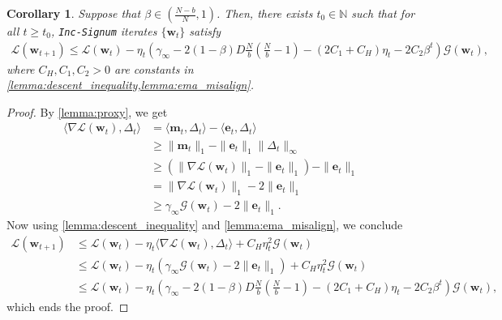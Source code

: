 \documentclass{article} %
\theoremstyle{plain}
\newtheorem{corollary}[theorem]{Corollary}
\theoremstyle{definition}
\theoremstyle{remark}
\def\gG{{\mathcal{G}}}
\newcommand{\Ls}{\mathcal{L}}
\def\bm{{\mathbf m}}
\def\be{{\mathbf e}}
\def\bw{{\mathbf w}}
\begin{document}
\begin{corollary}\label{cor:descent_inequality}
     Suppose that $\beta \in (\frac{N-b}{N}, 1)$. Then, there exists $t_0\in \mathbb N$ such that for all $t\geq t_0$, \textnormal{\texttt{Inc-Signum}} iterates $\{\bw_t\}$ satisfy
    \begin{align*}
        \Ls(\bw_{t+1}) \leq \Ls(\bw_t) - \eta_t (\gamma_\infty - 2(1-\beta)D \tfrac Nb (\tfrac Nb -1) - (2C_1+C_H)\eta_t - 2C_2\beta^t) \gG(\bw_t),
    \end{align*}
    where $C_H,C_1, C_2>0$ are constants in \cref{lemma:descent_inequality,lemma:ema_misalign}.
\end{corollary}
\begin{proof}
    By \cref{lemma:proxy}, we get
    \begin{align*}
        \langle \nabla \Ls (\bw_t), \Delta_t\rangle &= \langle \bm_t, \Delta_t\rangle - \langle \be_t, \Delta_t\rangle \\
        &\geq \|\bm_t\|_1 - \|\be_t\|_1 \|\Delta_t\|_\infty \\
        &\geq (\|\nabla \Ls(\bw_t)\|_1 -\|\be_t\|_1) - \|\be_t\|_1 \\
        &= \|\nabla \Ls(\bw_t)\|_1 - 2\|\be_t\|_1 \\
        &\geq \gamma_\infty \gG(\bw_t) - 2\|\be_t\|_1.
    \end{align*}
    Now using \cref{lemma:descent_inequality} and \cref{lemma:ema_misalign}, we conclude
    \begin{align*}
        \Ls(\bw_{t+1}) &\leq \Ls(\bw_t) - \eta_t \langle \nabla \Ls(\bw_t), \Delta_t\rangle + C_H \eta_t^2 \gG(\bw_t) \\
        &\leq  \Ls(\bw_t) -\eta_t (\gamma_\infty \gG(\bw_t) - 2\|\be_t\|_1) +C_H\eta_t^2 \gG(\bw_t)\\
        &\leq \Ls(\bw_t) - \eta_t  (\gamma_\infty - 2(1-\beta)D \tfrac Nb (\tfrac Nb -1) - (2C_1+C_H)\eta_t - 2C_2\beta^t) \gG(\bw_t),
    \end{align*}
    which ends the proof.
\end{proof}
\end{document}

